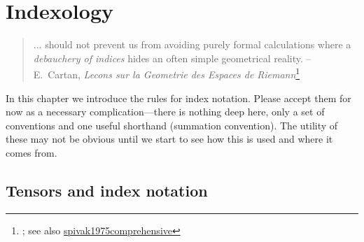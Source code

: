 

\chapter{Indexology}\label{ch:indexology}
\begin{quote}
... should not prevent us from avoiding purely formal calculations where a \emph{debauchery of indices} hides an often simple geometrical reality. -- E.~Cartan, \emph{Lecons sur la Geometrie des Espaces de Riemann}\footnote{\cite{spivak1975comprehensive}; see also \url{spivak1975comprehensive}}
\end{quote} %

In this chapter we introduce the rules for index notation. Please accept them for now as a necessary complication---there is nothing deep here, only a set of conventions and one useful shorthand (summation convention). The utility of these may not be obvious until we start to see how this is used and where it comes from.

\section{Tensors and index notation}
\label{sec:index:notation}


